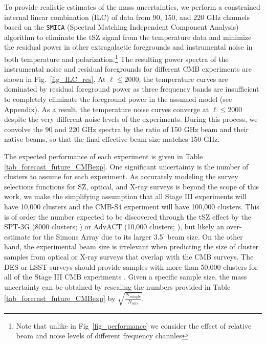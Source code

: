 To provide realistic estimates of the mass uncertainties, we perform a constrained internal linear combination (ILC) of data from 90, 150, and 220 GHz channels based on the \texttt{SMICA} (Spectral Matching Independent Component Analysis) algorithm \citep{cardoso08, planck14-09} to eliminate the tSZ signal from the temperature data and minimize the residual power in other extragalactic foregrounds and instrumental noise in both temperature and polarization.\footnote{Note that unlike in Fig~\ref{fig_performance} we consider the effect of relative beam and noise levels of different frequency channles}
The resulting power spectra of the instrumental noise and residual foregrounds for different CMB experiments are shown in Fig.~\ref{fig_ILC_res}.
At $\ell \le 2000$, the temperature curves are dominated by residual foreground power as three frequency bands are insufficient to completely eliminate the foreground power in the assumed model (see Appendix).
As a result, the temperature noise curves  converge at $\ell \le 2000$ despite the very different noise levels of the  experiments.
During this process, we convolve the 90 and 220 GHz spectra by the ratio of 150 GHz beam and their native beams, so that the final effective beam size matches 150 GHz.

The expected performance of each  experiment is given in Table \ref{tab_forecast_future_CMBexp}.
One significant uncertainty is the number of clusters to assume for each experiment.
As accurately modeling the survey selections functions for SZ, optical, and X-ray surveys is beyond the scope of this work, we make the simplifying assumption that all Stage III experiments will have 10,000 clusters and the CMB-S4 experiment will have 100,000 clusters.
This is of order the number expected to be discovered through the tSZ effect by the SPT-3G (8000 clusters; \citet{benson14}) or AdvACT (10,000 clusters; \citet{henderson16}), but likely an over-estimate for the Simons Array due to its larger 3.5$^\prime$ beam size.                                                                                                                                                      
On the other hand, the experimental beam size is irrelevant when predicting the size of cluster samples from optical or X-ray surveys that overlap with the CMB surveys.
The DES or LSST surveys should provide samples with more than 50,000 clusters for all of the Stage III CMB experiments \citep{rykoff16, lsst09}.
Given a specific sample size, the mass uncertainty can be obtained by rescaling the numbers provided in Table \ref{tab_forecast_future_CMBexp} by $\sqrt{\frac{N_{sample}}{N_{clus}}}$.

